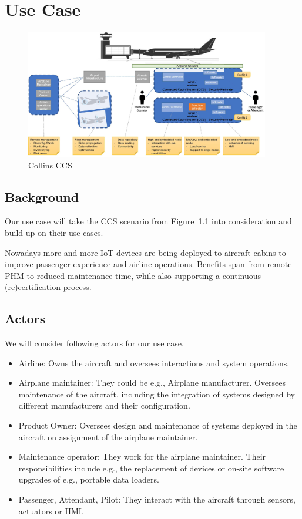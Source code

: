 \chapter{Use Case}

\begin{figure}
	\begin{center}
		\includegraphics[width=0.95\textwidth]{figures/collins-ccs.jpg}
	\end{center}
	\caption{Collins CCS}
	\label{fig:Collins CCS}
\end{figure}

\section{Background}

Our use case will take the CCS scenario from Figure~\ref{fig:Collins CCS} into consideration and build up on their use cases.

Nowadays more and more IoT devices are being deployed to aircraft cabins to improve passenger experience and airline
operations. Benefits span from remote PHM to reduced maintenance time, while also supporting a
continuous (re)certification process. %

\section{Actors}

We will consider following actors for our use case.

\begin{itemize}
	\item Airline:
	      Owns the aircraft and oversees interactions and system operations.
	\item Airplane maintainer: They could be e.g., Airplane manufacturer. Oversees maintenance of the aircraft,
	      including the integration of systems designed by different manufacturers and their configuration.
	\item Product Owner: Oversees design and maintenance of systems deployed in the aircraft on assignment of the
	      airplane maintainer.
	\item Maintenance operator: They work for the airplane maintainer. Their responsibilities include e.g.,
	      the replacement of devices or on-site software upgrades of e.g., portable data loaders.
	\item Passenger, Attendant, Pilot: They interact with the aircraft through sensors, actuators or HMI.
\end{itemize}

